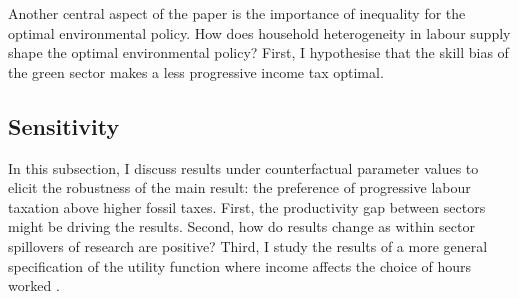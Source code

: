 Another central aspect of the paper is the importance of inequality for the optimal environmental policy. How does household heterogeneity in labour supply shape the optimal environmental policy? First, I hypothesise that the skill bias of the green sector makes a less progressive income tax optimal. 
\subsection{Sensitivity}
In this subsection, I discuss results under counterfactual parameter values to elicit the robustness of the main result: the preference of progressive labour taxation above higher fossil taxes. 
First, the productivity gap between sectors might be driving the results. Second, how do results change as within sector spillovers of research are positive? Third, I study the results of a more general specification of the utility function where income affects the choice of hours worked \citep{Boppart2019LaborPerspectiveb, Bick2018HowImplications}. 